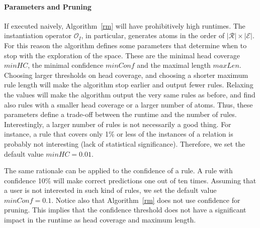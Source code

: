 \paragraph{Parameters and Pruning} 
If executed naively, Algorithm~\ref{rm} will have prohibitively high runtimes.
The instantiation operator $\mathcal{O}_I$, in particular, generates atoms in the order of $|\mathcal{R}| \times |\mathcal{E}|$.
For this reason the algorithm defines some parameters that determine when to stop with the exploration of the space. 
These are the minimal head coverage $minHC$, the minimal confidence $minConf$ and the maximal length $maxLen$.
Choosing larger thresholds on head coverage, and choosing a shorter maximum rule length will make the algorithm stop earlier 
and output fewer rules. Relaxing the values will make the algorithm output the very same rules as before, 
and find also rules with a smaller head coverage or a larger number of atoms. 
Thus, these parameters define a trade-off between the runtime and the number of rules. 
Interestingly, a larger number of rules is not necessarily a good thing. 
For instance, a rule that covers only 1\% or less of the instances of a relation is probably not interesting 
(lack of statistical significance). Therefore, we set the default value $minHC=0.01$. 

The same rationale can be applied to the confidence of a rule. A rule with confidence 10\% will make correct predictions one out of
ten times. Assuming that a user is not interested in such kind of rules, we set the default value $minConf=0.1$. 
Notice also that Algorithm~\ref{rm} does not use confidence for pruning. This implies that the confidence
threshold does not have a significant impact in the runtime as head coverage and maximum length.

